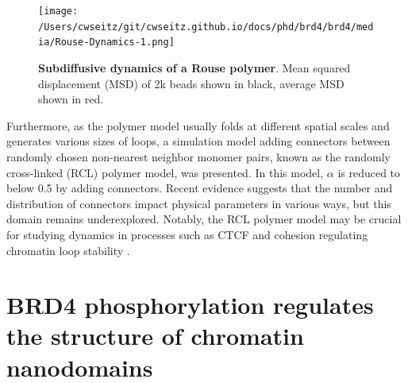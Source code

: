 \begin{figure}[t]
\centering
\texttt{[image: /Users/cwseitz/git/cwseitz.github.io/docs/phd/brd4/brd4/media/Rouse-Dynamics-1.png]}
\caption{\textbf{Subdiffusive dynamics of a Rouse polymer}.  Mean squared displacement (MSD) of 2k beads shown in black, average MSD shown in red.}
\label{fig:fig20}
\end{figure}


Furthermore, as the polymer model usually folds at different spatial scales and generates various sizes of loops, a simulation model adding connectors between randomly chosen non-nearest neighbor monomer pairs, known as the randomly cross-linked (RCL) polymer model, was presented. In this model, $\alpha$ is reduced to below 0.5 by adding connectors. Recent evidence suggests that the number and distribution of connectors impact physical parameters in various ways, but this domain remains underexplored. Notably, the RCL polymer model may be crucial for studying dynamics in processes such as CTCF and cohesion regulating chromatin loop stability \parencite{Hansen2017}.

\clearpage
\section{BRD4 phosphorylation regulates the structure of chromatin nanodomains}

